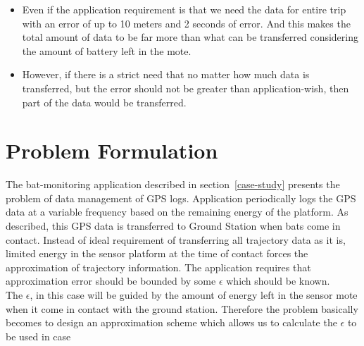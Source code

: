 \documentclass[conference]{IEEEtran}
\begin{document}
\begin{itemize}
\item Even if the application requirement is that we need the data for entire trip with an error of up to 10 meters and 2 seconds of error. And this makes the total amount of data to be far more than what can be transferred considering the amount of battery left in the mote.
\item However, if there is a strict need that no matter how much data is transferred, but the error should not be greater than application-wish, then part of the data would be transferred. 
\end{itemize}

\section{Problem Formulation}\label{sec:problem}

The bat-monitoring application described in section~\ref{case-study} presents the problem of data management of GPS logs. Application periodically logs the GPS data at a variable frequency based on the remaining energy of the platform. As described, this GPS data is transferred to Ground Station when bats come in contact. Instead of ideal requirement of transferring all trajectory data as it is, limited energy in the sensor platform at the time of contact forces the approximation of trajectory information. The application requires that approximation error should be bounded by some $\epsilon$ which should be known.\\
The $\epsilon$, in this case will be guided by the amount of energy left in the sensor mote when it come in contact with the ground station. Therefore the problem basically becomes to design an approximation scheme which allows us to calculate the $\epsilon$ to be used in case 
\end{document}
